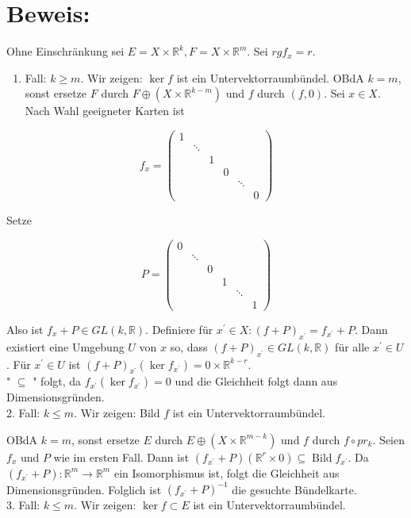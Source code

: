 \documentclass[10pt, letterpaper]{article}
\begin{document}
\section*{Beweis:}
Ohne Einschränkung sei $E=X \times \mathbb{R}^{k}, F=X \times \mathbb{R}^{m}$. Sei $r g f_{x}=r$.

\begin{enumerate}
  \item Fall: $k \geq m$. Wir zeigen: $\operatorname{ker} f$ ist ein Untervektorraumbündel. OBdA $k=m$, sonst ersetze $F$ durch $F \oplus\left(X \times \mathbb{R}^{k-m}\right)$ und $f$ durch $(f, 0)$. Sei $x \in X$. Nach Wahl geeigneter Karten ist
\end{enumerate}

$$
f_{x}=\left(\begin{array}{cccccc}
1 & & & & & \\
& \ddots & & & & \\
& & 1 & & & \\
& & & 0 & & \\
& & & & \ddots & \\
& & & & & 0
\end{array}\right)
$$

Setze

$$
P=\left(\begin{array}{cccccc}
0 & & & & & \\
& \ddots & & & & \\
& & 0 & & & \\
& & & 1 & & \\
& & & & \ddots & \\
& & & & & 1
\end{array}\right)
$$

Also ist $f_{x}+P \in G L(k, \mathbb{R})$. Definiere für $x^{\prime} \in X:(f+P)_{x^{\prime}}=f_{x^{\prime}}+P$. Dann existiert eine Umgebung $U$ von $x$ so, dass $(f+P)_{x^{\prime}} \in G L(k, \mathbb{R})$ für alle $x^{\prime} \in U$. Für $x^{\prime} \in U$ ist $(f+P)_{x^{\prime}}\left(\operatorname{ker} f_{x^{\prime}}\right)=0 \times \mathbb{R}^{k-r}$.\\
" $\subseteq$ " folgt, da $f_{x^{\prime}}\left(\operatorname{ker} f_{x^{\prime}}\right)=0$ und die Gleichheit folgt dann aus Dimensionsgründen.\\
2. Fall: $k \leq m$. Wir zeigen: Bild $f$ ist ein Untervektorraumbündel.

OBdA $k=m$, sonst ersetze $E$ durch $E \oplus\left(X \times \mathbb{R}^{m-k}\right)$ und $f$ durch $f \circ p r_{k}$. Seien $f_{x}$ und $P$ wie im ersten Fall. Dann ist $\left(f_{x^{\prime}}+P\right)\left(\mathbb{R}^{r} \times 0\right) \subseteq \operatorname{Bild} f_{x^{\prime}}$. Da $\left(f_{x^{\prime}}+P\right): \mathbb{R}^{m} \rightarrow \mathbb{R}^{m}$ ein Isomorphismus ist, folgt die Gleichheit aus Dimensionsgründen. Folglich ist $\left(f_{x^{\prime}}+P\right)^{-1}$ die gesuchte Bündelkarte.\\
3. Fall: $k \leq m$. Wir zeigen: $\operatorname{ker} f \subset E$ ist ein Untervektorraumbündel.
\end{document}
